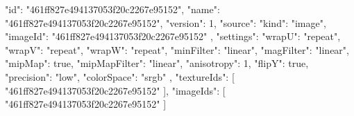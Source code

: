 {
  "id": "461ff827e494137053f20c2267e95152",
  "name": "461ff827e494137053f20c2267e95152",
  "version": 1,
  "source": {
    "kind": "image",
    "imageId": "461ff827e494137053f20c2267e95152"
  },
  "settings": {
    "wrapU": "repeat",
    "wrapV": "repeat",
    "wrapW": "repeat",
    "minFilter": "linear",
    "magFilter": "linear",
    "mipMap": true,
    "mipMapFilter": "linear",
    "anisotropy": 1,
    "flipY": true,
    "precision": "low",
    "colorSpace": "srgb"
  },
  "textureIds": [
    "461ff827e494137053f20c2267e95152"
  ],
  "imageIds": [
    "461ff827e494137053f20c2267e95152"
  ]
}
